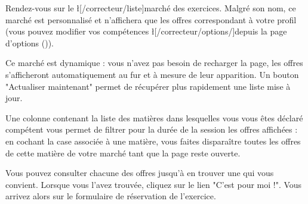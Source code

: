 ﻿Rendez-vous sur le \l[/correcteur/liste]{marché des exercices}. Malgré son nom, ce marché est personnalisé et n'affichera que les offres correspondant à votre profil (vous pouvez modifier vos compétences \l[/correcteur/options/]{depuis la page d'options} ()).

Ce marché est dynamique : vous n'avez pas besoin de recharger la page, les offres s'afficheront automatiquement au fur et à mesure de leur apparition. Un bouton "Actualiser maintenant" permet de récupérer plus rapidement une liste mise à jour.

Une colonne contenant la liste des matières dans lesquelles vous vous êtes déclaré compétent vous permet de filtrer pour la durée de la session les offres affichées : en cochant la case associée à une matière, vous faites disparaître toutes les offres de cette matière de votre marché tant que la page reste ouverte.

Vous pouvez consulter chacune des offres jusqu'à en trouver une qui vous convient.
Lorsque vous l'avez trouvée, cliquez sur le lien "C'est pour moi !".
Vous arrivez alors sur le formulaire de réservation de l'exercice.